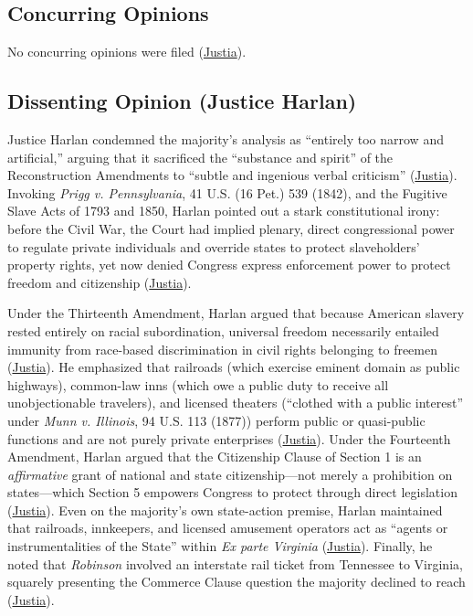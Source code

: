 \documentclass[12pt]{article}
\begin{document}
\subsection{Concurring Opinions}

No concurring opinions were filed (\href{https://supreme.justia.com/cases/federal/us/109/3/}{Justia}).

\subsection{Dissenting Opinion (Justice Harlan)}

Justice Harlan condemned the majority's analysis as ``entirely too narrow and artificial,'' arguing that it sacrificed the ``substance and spirit'' of the Reconstruction Amendments to ``subtle and ingenious verbal criticism'' (\href{https://supreme.justia.com/cases/federal/us/109/3/}{Justia}). Invoking \textit{Prigg v. Pennsylvania}, 41 U.S. (16 Pet.) 539 (1842), and the Fugitive Slave Acts of 1793 and 1850, Harlan pointed out a stark constitutional irony: before the Civil War, the Court had implied plenary, direct congressional power to regulate private individuals and override states to protect slaveholders' property rights, yet now denied Congress express enforcement power to protect freedom and citizenship (\href{https://supreme.justia.com/cases/federal/us/109/3/}{Justia}).

Under the Thirteenth Amendment, Harlan argued that because American slavery rested entirely on racial subordination, universal freedom necessarily entailed immunity from race-based discrimination in civil rights belonging to freemen (\href{https://supreme.justia.com/cases/federal/us/109/3/}{Justia}). He emphasized that railroads (which exercise eminent domain as public highways), common-law inns (which owe a public duty to receive all unobjectionable travelers), and licensed theaters (``clothed with a public interest'' under \textit{Munn v. Illinois}, 94 U.S. 113 (1877)) perform public or quasi-public functions and are not purely private enterprises (\href{https://supreme.justia.com/cases/federal/us/109/3/}{Justia}). Under the Fourteenth Amendment, Harlan argued that the Citizenship Clause of Section 1 is an \textit{affirmative} grant of national and state citizenship---not merely a prohibition on states---which Section 5 empowers Congress to protect through direct legislation (\href{https://supreme.justia.com/cases/federal/us/109/3/}{Justia}). Even on the majority's own state-action premise, Harlan maintained that railroads, innkeepers, and licensed amusement operators act as ``agents or instrumentalities of the State'' within \textit{Ex parte Virginia} (\href{https://supreme.justia.com/cases/federal/us/109/3/}{Justia}). Finally, he noted that \textit{Robinson} involved an interstate rail ticket from Tennessee to Virginia, squarely presenting the Commerce Clause question the majority declined to reach (\href{https://supreme.justia.com/cases/federal/us/109/3/}{Justia}).
\end{document}
